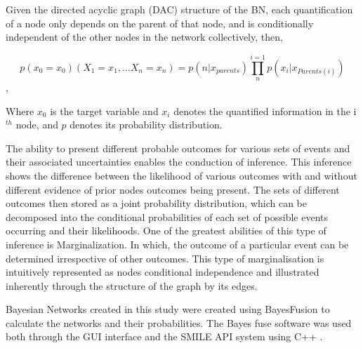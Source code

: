 \documentclass[fleqn,10pt]{wlscirep}
\begin{document}


Given the directed acyclic graph (DAC) structure of the BN, each quantification of a node only depends on the parent of that node, and is conditionally independent of the other nodes in the network collectively, then,

\begin{equation}
        p(x_{0}=x_{0}) (X_{1}=x_{1},\ldots X_{n}=x_{n})=p(n|x_{parents})\prod_{n}^{i=1}p(x_{i}|x_{Parents(i)})
\end{equation},

Where $x_0$ is the target variable and $x_i$ denotes the quantified information in the i$^{th}$ node, and $p$ denotes its probability distribution.

The ability to present different probable outcomes for various sets of events and their associated uncertainties enables the conduction of inference. This inference shows the difference between the likelihood of various outcomes with and without different evidence of prior nodes outcomes being present. The sets of different outcomes then stored as a joint probability distribution, which can be decomposed into the conditional probabilities of each set of possible events occurring and their likelihoods. One of the greatest abilities of this type of inference is Marginalization. In which, the outcome of a particular event can be determined irrespective of other outcomes. This type of marginalisation is intuitively represented as nodes conditional independence and illustrated inherently through the structure of the graph by its edges.

Bayesian Networks created in this study were created using BayesFusion  to calculate the networks and their probabilities. The Bayes fuse software was used both through the GUI interface and the SMILE API  system using C++ .
\end{document}

